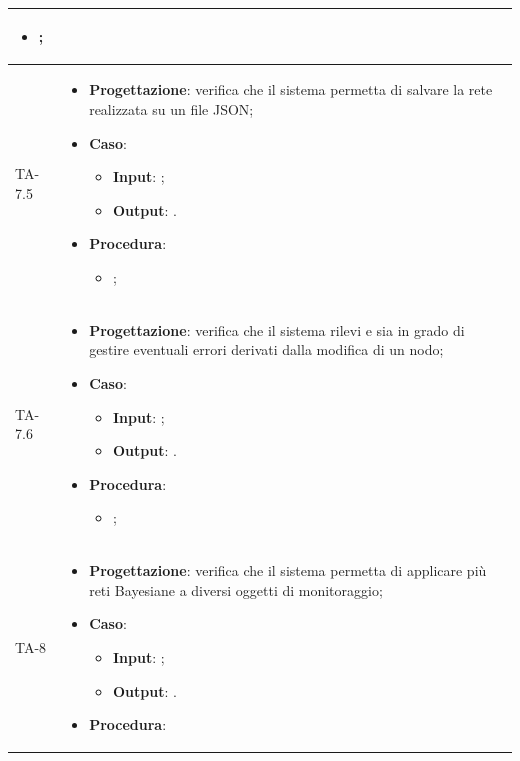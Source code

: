 \begin{longtable}{|C{2.5cm}|C{13cm}|}
\begin{itemize}
	\begin{itemize}
		\item ;
	\end{itemize} 
\end{itemize}\\
\hline
{TA-7.5} &
\begin{itemize}
	\item \textbf{Progettazione}: verifica che il sistema permetta di salvare la rete realizzata su un file JSON;
	\item \textbf{Caso}: 
	\begin{itemize}
		\item \textbf{Input}: ;
		\item \textbf{Output}: .
	\end{itemize}
	\item \textbf{Procedura}:
	\begin{itemize}
		\item ;
	\end{itemize} 
\end{itemize} \\
\hline
{TA-7.6} &
\begin{itemize}
	\item \textbf{Progettazione}: verifica che il sistema rilevi e sia in grado di gestire eventuali errori derivati dalla modifica di un nodo;
	\item \textbf{Caso}: 
	\begin{itemize}
		\item \textbf{Input}: ;
		\item \textbf{Output}: .
	\end{itemize}
	\item \textbf{Procedura}:
	\begin{itemize}
		\item ;
	\end{itemize} 
\end{itemize} \\
\hline
{TA-8} &
\begin{itemize}
	\item \textbf{Progettazione}: verifica che il sistema permetta di applicare più reti Bayesiane a diversi oggetti di monitoraggio;
	\item \textbf{Caso}: 
	\begin{itemize}
		\item \textbf{Input}: ;
		\item \textbf{Output}: .
	\end{itemize}
	\item \textbf{Procedura}:

\end{itemize}
\end{longtable}
